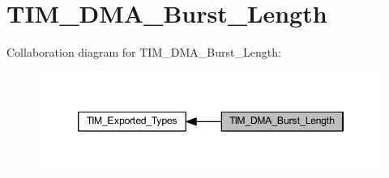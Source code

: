 \hypertarget{group___t_i_m___d_m_a___burst___length}{}\section{T\+I\+M\+\_\+\+D\+M\+A\+\_\+\+Burst\+\_\+\+Length}
\label{group___t_i_m___d_m_a___burst___length}
Collaboration diagram for T\+I\+M\+\_\+\+D\+M\+A\+\_\+\+Burst\+\_\+\+Length\+:
\nopagebreak
\begin{figure}[H]
\begin{center}
\leavevmode
\includegraphics[width=346pt]{group___t_i_m___d_m_a___burst___length}
\end{center}
\end{figure}

